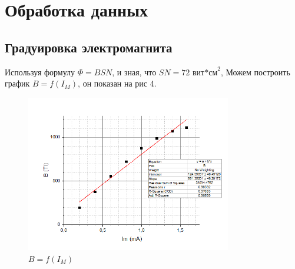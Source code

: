 \documentclass[a4paper, 14pt]{extarticle}%
\newcommand\ECaption[1]{%
     \captionsetup{font=footnotesize}%
     \caption{#1}}
\begin{document}
\section*{Обработка данных}
\subsection*{Градуировка электромагнита}
Используя формулу $\Phi=BSN$, и зная, что $SN = 72\text{ вит*см}^2$, Можем построить график $B = f(I_M)$, он показан на рис 4.

\begin{figure}[h!]
\begin{center}
\includegraphics[width=0.8\textwidth]{grbi}
\end{center}
\ECaption{$B = f(I_M)$}
\end{figure}
\end{document}

